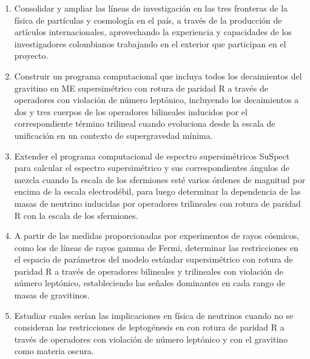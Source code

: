 \begin{enumerate}
\item Consolidar y ampliar las líneas de investigación en las tres
  fronteras de la física de partículas y cosmología en el país, a
  través de la producción de artículos internacionales, aprovechando la
  experiencia y capacidades de los investigadores colombianos
  trabajando en el exterior que participan en el proyecto.

\item \begin{gravitinodm}
  Construir un programa computacional que incluya todos los
  decaimientos del gravitino en ME supersimétrico con
  rotura de paridad R a través de operadores con violación de número
  leptónico, incluyendo los decaimientos a dos y tres cuerpos de los
  operadores bilineales inducidos por el correspondiente término
  trilineal cuando evoluciona desde la escala de unificación en un
  contexto de supergravedad mínima.
\end{gravitinodm}
\label{item:gravitinodm1}

\item 
\begin{gravitinodm}
  Extender el programa computacional de espectro supersimétricos
  SuSpect~\cite{Djouadi:2002ze} para calcular el espectro supersimétrico y sus
  correspondientes ángulos de mezcla cuando la escala de los
  sfermiones esté varios órdenes de magnitud por encima de la escala
  electrodébil, para luego determinar la dependencia de las masas
  de neutrino inducidas por operadores trilineales con rotura de
  paridad R con la escala de los sfermiones.
\end{gravitinodm}
\label{item:gravitinodm2}
\item 
\begin{gravitinodm}
  A partir de las medidas proporcionadas por experimentos de rayos cósmicos, como los
  de líneas de rayos gamma de Fermi, determinar las restricciones
  en el espacio de parámetros del modelo estándar supersimétrico con
  rotura de paridad R a través de operadores bilineales y trilineales
  con violación de número leptónico, estableciendo las señales
  dominantes en cada rango de masas de gravitinos.
\end{gravitinodm}

\item
\begin{gravitinodm}
  Estudiar cuales serían las implicaciones en física de neutrinos
  cuando no se consideran las restricciones de leptogénesis en con
  rotura de paridad R a través de operadores con violación de número
  leptónico y con el gravitino como materia oscura.
\end{gravitinodm}


\end{enumerate}
